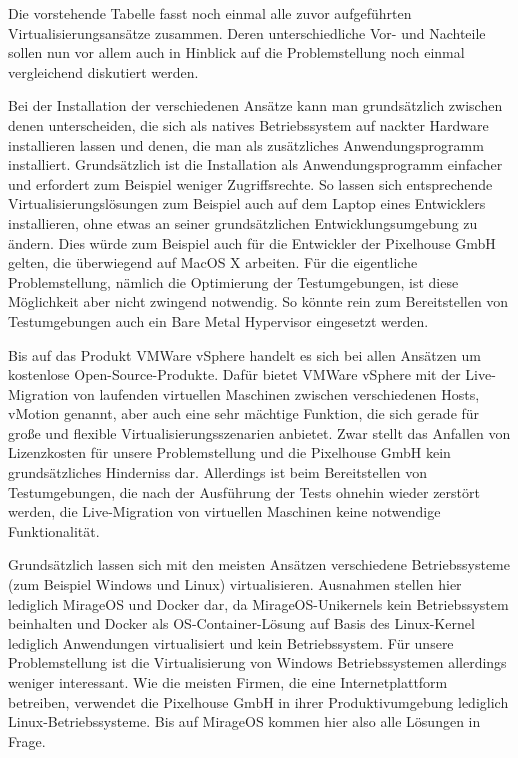 Die vorstehende Tabelle fasst noch einmal alle zuvor aufgeführten Virtualisierungsansätze zusammen. Deren unterschiedliche Vor- und Nachteile sollen nun vor allem auch in Hinblick auf die Problemstellung noch einmal vergleichend diskutiert werden.

Bei der Installation der verschiedenen Ansätze kann man grundsätzlich zwischen denen unterscheiden, die sich als natives Betriebssystem auf nackter Hardware installieren lassen und denen, die man als zusätzliches Anwendungsprogramm installiert. Grundsätzlich ist die Installation als Anwendungsprogramm einfacher und erfordert zum Beispiel weniger Zugriffsrechte. So lassen sich entsprechende Virtualisierungslösungen zum Beispiel auch auf dem Laptop eines Entwicklers installieren, ohne etwas an seiner grundsätzlichen Entwicklungsumgebung zu ändern. Dies würde zum Beispiel auch für die Entwickler der Pixelhouse GmbH gelten, die überwiegend auf MacOS X arbeiten. Für die eigentliche Problemstellung, nämlich die Optimierung der Testumgebungen, ist diese Möglichkeit aber nicht zwingend notwendig. So könnte rein zum Bereitstellen von Testumgebungen auch ein Bare Metal Hypervisor eingesetzt werden.

Bis auf das Produkt VMWare vSphere handelt es sich bei allen Ansätzen um kostenlose Open-Source-Produkte. Dafür bietet VMWare vSphere mit der Live-Migration von laufenden virtuellen Maschinen zwischen verschiedenen Hosts, vMotion genannt, aber auch eine sehr mächtige Funktion, die sich gerade für große und flexible Virtualisierungsszenarien anbietet. Zwar stellt das Anfallen von Lizenzkosten für unsere Problemstellung und die Pixelhouse GmbH kein grundsätzliches Hinderniss dar. Allerdings ist beim Bereitstellen von Testumgebungen, die nach der Ausführung der Tests ohnehin wieder zerstört werden, die Live-Migration von virtuellen Maschinen keine notwendige Funktionalität.

Grundsätzlich lassen sich mit den meisten Ansätzen verschiedene Betriebssysteme (zum Beispiel Windows und Linux) virtualisieren. Ausnahmen stellen hier lediglich MirageOS und Docker dar, da MirageOS-Unikernels kein Betriebssystem beinhalten und Docker als OS-Container-Lösung auf Basis des Linux-Kernel lediglich Anwendungen virtualisiert und kein Betriebssystem. Für unsere Problemstellung ist die Virtualisierung von Windows Betriebssystemen allerdings weniger interessant. Wie die meisten Firmen, die eine Internetplattform betreiben, verwendet die Pixelhouse GmbH in ihrer Produktivumgebung lediglich Linux-Betriebssysteme. Bis auf MirageOS kommen hier also alle Lösungen in Frage.


